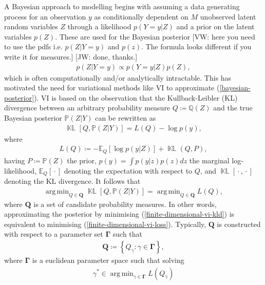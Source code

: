 \documentclass{article}
\newcommand{\jw}[1]{{\color{gray} [JW: #1]}}
\newcommand{\vw}[1]{{\color{green} [VW: #1]}}
\newcommand{\KLD}{\operatorname{\mathbb{KL}}}
\newcommand{\wc}{\operatorname{{}\cdot{}}}
\DeclareMathOperator*{\argmin}{arg\,min}
\numberwithin{equation}{section}
\begin{document}
A Bayesian approach to modelling begins with assuming a data generating process for an observation $y$ as conditionally dependent on $M$ unobserved latent random variables $Z$ through a likelihood $p(Y=y\vert Z)$ and a prior on the latent variables $p(Z)$. 
These are used for the Bayesian posterior \vw{here you need to use the pdfs i.e. $p(Z|Y=y)$ and $p(z)$. The formula looks different if you write it for measures.}\jw{done, thanks.}
\begin{align}
    p(Z \vert Y=y) \propto p(Y=y\vert Z)p(Z),
    \label{bayesian-posterior}
\end{align}
which is often computationally and/or analytically intractable. 
This has motivated the need for variational methods like VI to approximate (\ref{bayesian-posterior}). 
VI is based on the observation that the Kullback-Leibler (KL) divergence between an arbitrary probability measure $Q \coloneqq \mathbb{Q}(Z)$ and the true Bayesian posterior $\mathbb{P}(Z\vert Y)$ can be rewritten as
\begin{align}
    \KLD\left[Q, \mathbb{P}(Z \vert Y)\right] = L(Q) - \log p(y),
    \label{finite-dimensional-vi-kld}
\end{align}
where  
\begin{align}
    L(Q) \coloneqq -\mathbb{E}_{Q}\left[\log p(y \vert Z)\right] + \KLD(Q, P),
    \label{finite-dimensional-vi-loss}
\end{align}
having $P \coloneqq \mathbb{P}(Z)$ the prior, $p(y) = \int p(y\vert z)p(z) dz$ the marginal log-likelihood, $\mathbb{E}_{Q}\left[\wc \right]$ denoting the expectation with respect to $Q$, and $\KLD\left[\wc, \wc\right]$ denoting the KL divergence.
It follows that
\begin{align}
    \argmin_{Q \in \boldsymbol{Q}} \KLD\left[Q, \mathbb{P}(Z\vert Y)\right] = \argmin_{Q \in \boldsymbol{Q}} L(Q),
    \label{optimal-approximation-vi}
\end{align}
where $\boldsymbol{Q}$ is a set of candidate probability measures. 
In other words, approximating the posterior by minimising (\ref{finite-dimensional-vi-kld}) is equivalent to minimising (\ref{finite-dimensional-vi-loss}). Typically, $\boldsymbol{Q}$ is constructed with respect to a parameter set $\boldsymbol{\Gamma}$ such that 
\begin{align}
    \boldsymbol{Q} \coloneqq \left\{Q_{\gamma}: \gamma \in \boldsymbol{\Gamma} \right\},
\end{align}
where $\boldsymbol{\Gamma}$ is a euclidean parameter space such that solving
\begin{align}
    \gamma^* \in \argmin_{\gamma \in \boldsymbol{\Gamma}} L(Q_{\gamma})
\end{align}
\end{document}
